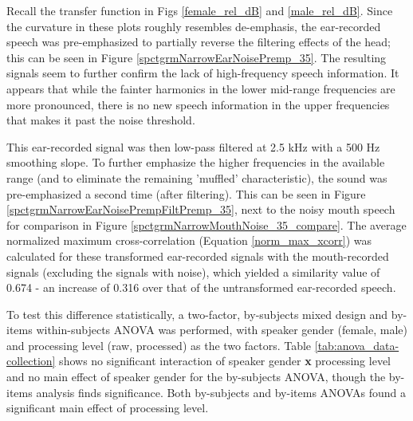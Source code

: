 Recall the transfer function in Figs \ref{female_rel_dB} and \ref{male_rel_dB}.  Since the curvature in these plots roughly resembles de-emphasis, the ear-recorded speech was pre-emphasized to partially reverse the filtering effects of the head; this can be seen in Figure \ref{spctgrmNarrowEarNoisePremp_35}. The resulting signals seem to further confirm the lack of high-frequency speech information. It appears that while the fainter harmonics in the lower mid-range frequencies are more pronounced, there is no new speech information in the upper frequencies that makes it past the noise threshold.

This ear-recorded signal was then low-pass filtered at 2.5 kHz with a 500 Hz smoothing slope. To further emphasize the higher frequencies in the available range (and to eliminate the remaining 'muffled' characteristic), the sound was pre-emphasized a second time (after filtering).  This can be seen in Figure \ref{spctgrmNarrowEarNoisePrempFiltPremp_35}, next to the noisy mouth speech for comparison in Figure \ref{spctgrmNarrowMouthNoise_35_compare}.  The average normalized maximum cross-correlation (Equation \ref{norm_max_xcorr}) was calculated for these transformed ear-recorded signals with the mouth-recorded signals (excluding the signals with noise), which yielded a similarity value of 0.674 - an increase of 0.316 over that of the untransformed ear-recorded speech.

To test this difference statistically, a two-factor, by-subjects mixed design and by-items within-subjects ANOVA was performed, with speaker gender (female, male) and processing level (raw, processed) as the two factors.  Table \ref{tab:anova_data-collection} shows no significant interaction of speaker gender \textbf{x} processing level and no main effect of speaker gender for the by-subjects ANOVA, though the by-items analysis finds significance.  Both by-subjects and by-items ANOVAs found a significant main effect of processing level.




